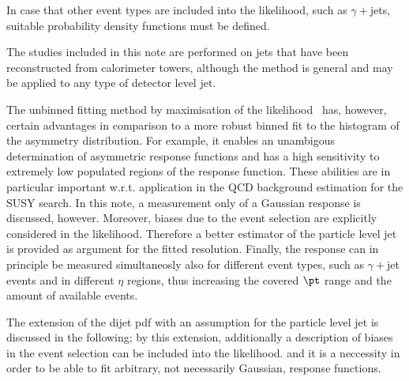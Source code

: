 In case that other event types are included into the likelihood, such as $\gamma+$jets, suitable probability density functions must be defined.

The studies included in this note are performed on jets that have been reconstructed from calorimeter towers, although the method is general and may be applied to any type of detector level jet.



The unbinned fitting method by maximisation of the
likelihood~ has, however, certain advantages in
comparison to a more robust binned fit to the histogram of the asymmetry distribution.
For example, it enables an unambigous
determination of asymmetric response functions and has a high sensitivity to
extremely low populated regions of the response function.
These abilities are in particular important w.r.t. application in
the QCD background estimation for the SUSY search.
In this note, a measurement only of a Gaussian response is discussed,
however.
Moreover, biases due to the event selection are explicitly considered
in the likelihood.
Therefore a better estimator of the particle level jet \pt is provided
as argument for the fitted resolution.
Finally, the response can in principle be measured simultaneosly
also for different event types, such as $\gamma+$jet events and in different
$\eta$ regions, thus increasing the covered $\pt$ range and the amount
of available events.

The extension of the dijet pdf with an assumption for the particle
level jet \pt is discussed in the following; by this extension,
additionally a description of biases in the event selection can be
included into the likelihood. and it is a neccessity in order to be
able to fit arbitrary, not necessarily Gaussian, response functions.
